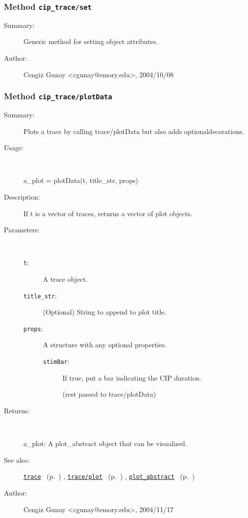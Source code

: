 \subsubsection[Method \texttt{set}]{Method \texttt{cip\_trace/set}}%
%
\label{ref_cip_trace__set}%
\hypertarget{ref_cip_trace__set}{}%
\begin{description}
\item[Summary:]Generic method for setting object attributes.
%
%
%
%
%
%
%
\item[Author:]%
Cengiz Gunay <cgunay@emory.edu>, 2004/10/08%
\end{description}
\methodline%
\subsubsection[Method \texttt{plotData}]{Method \texttt{cip\_trace/plotData}}%
%
\label{ref_cip_trace__plotData}%
\hypertarget{ref_cip_trace__plotData}{}%
\begin{description}
\item[Summary:]Plots a trace by calling trace/plotData but also adds optionaldecorations.
%
\item[Usage:]~%
\begin{lyxcode}%
a\_plot = plotData(t, title\_str, props)
%
\end{lyxcode}%
%
\item[Description:]%
If t is a vector of traces, returns a vector of plot objects.
\item[Parameters:]~
\begin{description}%
\item[\texttt{t}:]
 A trace object.
\item[\texttt{title\_str}:]
 (Optional) String to append to plot title.
\item[\texttt{props}:]
 A structure with any optional properties.
\begin{description}%
\item[\texttt{stimBar}:]
 If true, put a bar indicating the CIP duration.

(rest passed to trace/plotData)\end{description}%
\end{description}%
%
\item[Returns:]~

	a\_plot: A plot\_abstract object that can be visualized.
%
%
\item[See also:]%
\hyperlink{ref_trace}{\texttt{trace}}%
\ (p.~\pageref{ref_trace})%
%
, \hyperlink{ref_trace__plot}{\texttt{trace/plot}}%
\ (p.~\pageref{ref_trace__plot})%
%
, \hyperlink{ref_plot_abstract}{\texttt{plot\_abstract}}%
\ (p.~\pageref{ref_plot_abstract})%
%
%
\item[Author:]%
Cengiz Gunay <cgunay@emory.edu>, 2004/11/17%
\end{description}
\methodline%
